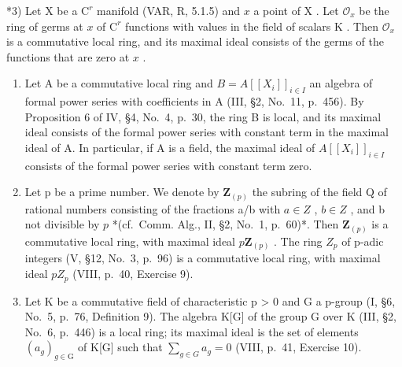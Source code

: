 *3) Let \(\mathrm{X}\) be a \(\mathrm{C}^r\) manifold (VAR, R, 5.1.5) and \(x\) a point of \(\mathrm{X}\) . Let \(\mathcal{O}_x\) be the ring of germs at \(x\) of \(\mathrm{C}^r\) functions with values in the field of scalars \(\mathrm{K}\) . Then \(\mathcal{O}_x\) is a commutative local ring, and its maximal ideal consists of the germs of the functions that are zero at \(x\) .

\begin{enumerate}
\def\labelenumi{\arabic{enumi})}
\setcounter{enumi}{3}
\item
  Let A be a commutative local ring and \(B = A[[X_{i}]]_{i \in I}\) an algebra of formal power series with coefficients in A (III, §2, No.~11, p.~456). By Proposition 6 of IV, §4, No.~4, p.~30, the ring B is local, and its maximal ideal consists of the formal power series with constant term in the maximal ideal of A. In particular, if A is a field, the maximal ideal of \(A[[X_{i}]]_{i \in I}\) consists of the formal power series with constant term zero.
\item
  Let p be a prime number. We denote by \(\mathbf{Z}_{(p)}\) the subring of the field Q of rational numbers consisting of the fractions a/b with \(a \in Z\) , \(b \in Z\) , and b not divisible by \(p\) *(cf.~Comm. Alg., II, §2, No.~1, p.~60)*. Then \(\mathbf{Z}_{(p)}\) is a commutative local ring, with maximal ideal \(p\mathbf{Z}_{(p)}\) . The ring \(Z_{p}\) of p-adic integers (V, §12, No.~3, p.~96) is a commutative local ring, with maximal ideal \(pZ_{p}\) (VIII, p.~40, Exercise 9).
\item
  Let K be a commutative field of characteristic p \textgreater{} 0 and G a p-group (I, §6, No.~5, p.~76, Definition 9). The algebra K{[}G{]} of the group G over K (III, §2, No.~6, p.~446) is a local ring; its maximal ideal is the set of elements \((a_{g})_{g \in \mathrm{G}}\) of K{[}G{]} such that \(\sum_{g \in G} a_{g} = 0\) (VIII, p.~41, Exercise 10).
\end{enumerate}

